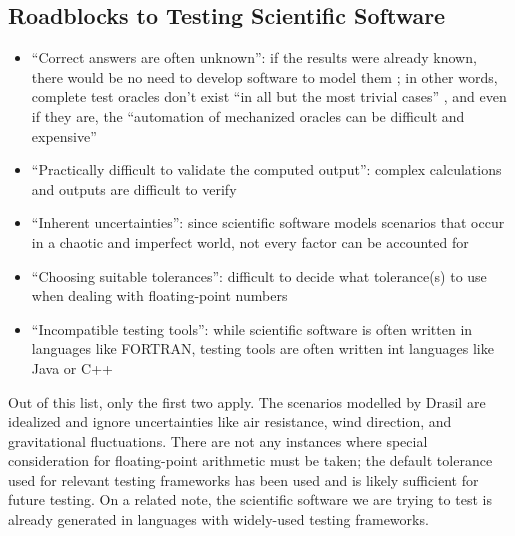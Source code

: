 \subsection{Roadblocks to Testing Scientific Software
      \citep[p.~67]{KanewalaAndYuehChen2019}}
\label{chap:notes:sec:sci-testing-roadblocks}
\begin{itemize}
      \item ``Correct answers are often unknown'': if the results were already
            known, there would be no need to develop software to model them
            \citep[p.~67]{KanewalaAndYuehChen2019}; in other words, complete
            test oracles don't exist ``in all but the most trivial cases''
            \citep[p.~510]{BarrEtAl2015}, and even if they are, the
            ``automation of mechanized oracles can be difficult and expensive''
            \citep[p.~5.5]{SWEBOK2024}
      \item ``Practically difficult to validate the computed output'': complex
            calculations and outputs are difficult to verify
            \citep[p.~67]{KanewalaAndYuehChen2019}
      \item ``Inherent uncertainties'': since scientific software models
            scenarios that occur in a chaotic and imperfect world, not every
            factor can be accounted for \citep[p.~67]{KanewalaAndYuehChen2019}
      \item ``Choosing suitable tolerances'': difficult to decide what
            tolerance(s) to use when dealing with floating-point numbers
            \citep[p.~67]{KanewalaAndYuehChen2019}
      \item ``Incompatible testing tools'': while scientific software is often
            written in languages like FORTRAN, testing tools are often written
            int languages like Java or C++ \citep[p.~67]{KanewalaAndYuehChen2019}
\end{itemize}

Out of this list, only the first two apply. The scenarios modelled by Drasil
are idealized and ignore uncertainties like air resistance, wind direction,
and gravitational fluctuations. There are not any instances where special
consideration for floating-point arithmetic must be taken; the default
tolerance used for relevant testing frameworks has been used
 and is likely sufficient for future testing. On a related
note, the scientific software we are trying to test is already generated in
languages with widely-used testing frameworks. 
